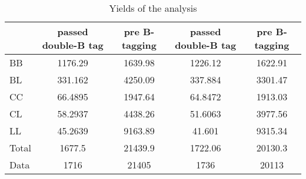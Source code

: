 \documentclass[10pt]{article}
\begin{document}
\begin{table}[htbp]
\begin{center}
\begin{tabular}{|l|S|S|S|S|}
\hline 
 & {passed double-B tag} & {pre B-tagging} & {passed double-B tag} & {pre B-tagging}\\
\hline 
  BB   & 1176.29  & 1639.98  & 1226.12  & 1622.91  \\ 
  BL   & 331.162  & 4250.09  & 337.884  & 3301.47  \\ 
  CC   & 66.4895  & 1947.64  & 64.8472  & 1913.03  \\ 
  CL   & 58.2937  & 4438.26  & 51.6063  & 3977.56  \\ 
  LL   & 45.2639  & 9163.89  & 41.601  & 9315.34  \\ 
\hline 
  Total  & 1677.5  & 21439.9  & 1722.06  & 20130.3  \\ 
\hline 
  Data   & 1716 & 21405 & 1736 & 20113 \\ 
\hline 
\end{tabular} 
\caption{Yields of the analysis} 
\end{center} 
\end{table} 
\end{document}
